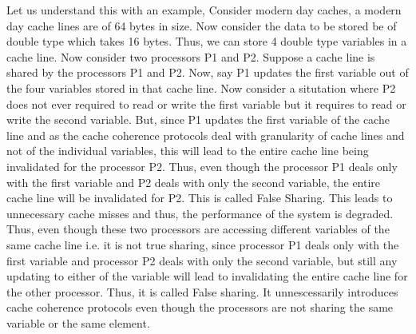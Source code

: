 \documentclass[12pt]{article}
\begin{document}
Let us understand this with an example, Consider modern day caches, a modern day cache lines are of 64 bytes in size. 
Now consider the data to be stored be of double type which takes 16 bytes. Thus, we can store 4 double type variables in a cache line.
Now consider two processors P1 and P2. Suppose a cache line is shared by the processors P1 and P2. 
Now, say P1 updates the first variable out of the four variables stored in that cache line. Now consider a situtation 
where P2 does not ever required to read or write the first variable but it requires to read or write the second variable.
But, since P1 updates the first variable of the cache line and as the cache coherence protocols deal with granularity of cache lines and not
of the individual variables, this will lead to the entire cache line being invalidated for the processor P2. Thus, even though the processor P1 deals only with the first variable and P2 deals with only the second variable,
the entire cache line will be invalidated for P2. This is called False Sharing. This leads to unnecessary cache misses and thus, the performance of the system is degraded. Thus, even though these two processors are accessing different variables of the same cache line
i.e. it is not true sharing, since processor P1 deals only with the first variable and processor P2 deals with only the second variable, but still any updating to either of the variable will lead to invalidating the entire cache line for the other processor. 
Thus, it is called False sharing. It unnescessarily introduces cache coherence protocols even though the processors are not sharing the same variable or the same element.

\newpage
\end{document}
